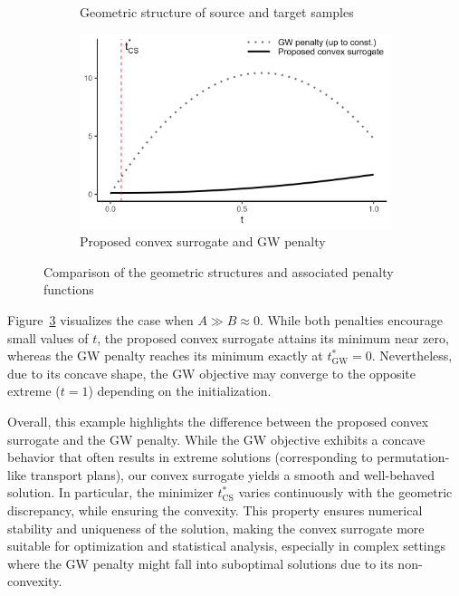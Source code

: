 \documentclass{article}
\begin{document}
\begin{figure}[t]
\begin{subfigure}[t]{0.49\textwidth}
		\caption{Geometric structure of source and target samples}
		\label{fig:motivating-geometry}
	\end{subfigure}
	\begin{subfigure}[t]{0.49\textwidth}
		\centering
		\includegraphics[width=\textwidth]{../simulation/convex_vs_gw.png}
		\caption{Proposed convex surrogate and GW penalty}
		\label{fig:motivating-penalty-trajectory}
	\end{subfigure}
	\caption{Comparison of the geometric structures and associated penalty functions}
	\label{fig:motivating-example}
\end{figure}
Figure~\ref{fig:motivating-example} visualizes the case when $A \gg B \approx 0$. While both penalties encourage small values of $t$, the proposed convex surrogate attains its minimum near zero, whereas the GW penalty reaches its minimum exactly at $t_{\mathrm{GW}}^\ast = 0$. Nevertheless, due to its concave shape, the GW objective may converge to the opposite extreme ($t = 1$) depending on the initialization.

Overall, this example highlights the difference between the proposed convex surrogate and the GW penalty. While the GW objective exhibits a concave behavior that often results in extreme solutions (corresponding to permutation-like transport plans), our convex surrogate yields a smooth and well-behaved solution. In particular, the minimizer $t_{\mathrm{CS}}^\ast$ varies continuously with the geometric discrepancy, while ensuring the convexity. This property ensures numerical stability and uniqueness of the solution, making the convex surrogate more suitable for optimization and statistical analysis, especially in complex settings where the GW 
penalty might fall into suboptimal solutions due to its non-convexity.
\end{document}
